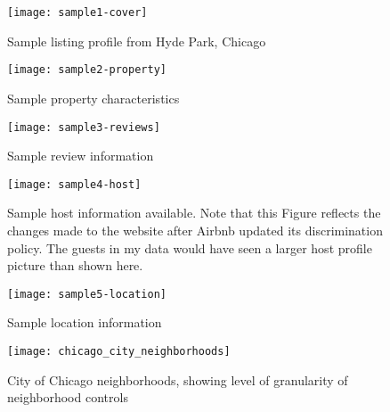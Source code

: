 \documentclass[11pt, oneside]{article}
\begin{document}











\listoffigures

\begin{figure}
\texttt{[image: sample1-cover]}
\caption{Sample listing profile from Hyde Park, Chicago}
\end{figure}
\begin{figure}
\texttt{[image: sample2-property]}
\caption{Sample property characteristics}
\end{figure}
\begin{figure}
\texttt{[image: sample3-reviews]}
\caption{Sample review information}
\end{figure}
\begin{figure}
\texttt{[image: sample4-host]}
\caption[Sample host information]{Sample host information available. Note that this Figure reflects the changes made to the website after Airbnb updated its discrimination policy. The guests in my data would have seen a larger host profile picture than shown here.}
\end{figure}
\begin{figure}
\texttt{[image: sample5-location]}
\caption{Sample location information}
\end{figure}
\begin{figure}
\texttt{[image: chicago\_city\_neighborhoods]}
\caption[City of Chicago neighborhoods]{City of Chicago neighborhoods, showing level of granularity of neighborhood controls}
\end{figure}


\newpage
\end{document}
